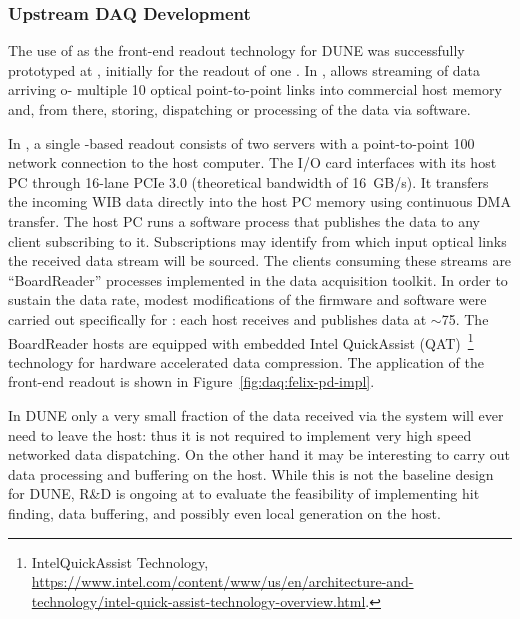 \subsubsection{Upstream DAQ Development}
The use of  as the front-end readout technology for DUNE was
successfully prototyped at , initially for the readout of one
. In ,  allows streaming of data arriving o- multiple \SI{10}{\Gbps} optical point-to-point links into commercial host memory and,
from there, storing, dispatching or processing of the data via
software. 

In , a single  -based readout consists of two servers with a point-to-point \SI{100}{\Gbps} network connection to the  host computer.
The  I/O card interfaces with its host PC through 16-lane PCIe 3.0 (theoretical bandwidth of \SI{16}{GB/s}).
It transfers the incoming WIB data directly into the host PC memory using continuous DMA transfer. The  host PC runs a software process that publishes the data to any client subscribing to it.
Subscriptions may identify from which input optical links the received data stream will be sourced.
The clients consuming these streams are ``BoardReader'' processes implemented in the  data acquisition toolkit.
In order to sustain the data rate, modest modifications of the firmware and software were carried out specifically for : each  host receives and publishes data at $\sim$\SI{75}{\Gbps}. The BoardReader hosts are equipped with embedded Intel QuickAssist (QAT)~\footnote{Intel\textregistered QuickAssist Technology, \url{https://www.intel.com/content/www/us/en/architecture-and-technology/intel-quick-assist-technology-overview.html}.} technology for hardware accelerated data compression. The  application of the  front-end readout is shown in Figure~\ref{fig:daq:felix-pd-impl}.


In DUNE only a very small fraction of the data received via the 
system will ever need to leave the host: thus it is not required to
implement very high speed networked data dispatching. On the other
hand it may be interesting to carry out data processing and buffering
on the host. While this is not the baseline design for DUNE, R\&D is
ongoing at  to evaluate the feasibility of
implementing hit finding, data buffering, and possibly even local
 generation on the  host. 


